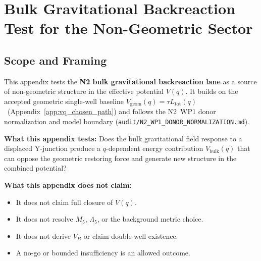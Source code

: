 
\chapter{Bulk Gravitational Backreaction Test for the Non-Geometric Sector}
\label{app:P2_N2_bulk}

\section{Scope and Framing}
\label{sec:P2N2:scope}

This appendix tests the \textbf{N2 bulk gravitational backreaction lane}
as a source of non-geometric structure in the effective potential $V(q)$.
It builds on the accepted geometric single-well baseline
$V_{\mathrm{geom}}(q) = \tau L_{\mathrm{tot}}(q)$ \tagDc\
(Appendix~\ref{app:vq_chosen_path}) and follows the N2~WP1 donor
normalization and model boundary
(\texttt{audit/N2\_WP1\_DONOR\_NORMALIZATION.md}).

\textbf{What this appendix tests:}
Does the bulk gravitational field response to a displaced Y-junction
produce a $q$-dependent energy contribution $V_{\mathrm{bulk}}(q)$
that can oppose the geometric restoring force and generate new
structure in the combined potential?

\textbf{What this appendix does not claim:}
\begin{itemize}
    \item It does not claim full closure of $V(q)$.
    \item It does not resolve $M_5$, $\Lambda_5$, or the background
          metric choice.
    \item It does not derive $V_B$ or claim double-well existence.
    \item A no-go or bounded insufficiency is an allowed outcome.
\end{itemize}

